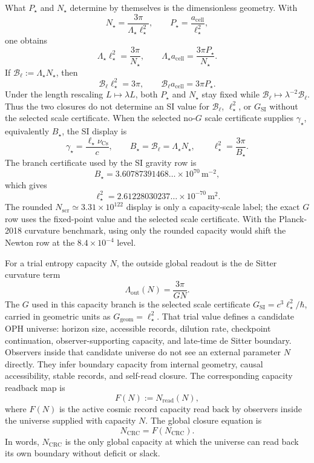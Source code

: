 What \(P_\star\) and \(N_\star\) determine by themselves is the dimensionless geometry. With
\[
N_\star=\frac{3\pi}{\Lambda_\star\ell_\star^2},
\qquad
P_\star=\frac{a_{\mathrm{cell}}}{\ell_\star^2},
\]
one obtains
\[
\Lambda_\star\ell_\star^2=\frac{3\pi}{N_\star},
\qquad
\Lambda_\star a_{\mathrm{cell}}=\frac{3\pi P_\star}{N_\star}.
\]
If \(\mathcal B_\ell:=\Lambda_\star N_\star\), then
\[
\mathcal B_\ell\ell_\star^2=3\pi,
\qquad
\mathcal B_\ell a_{\mathrm{cell}}=3\pi P_\star.
\]
Under the length rescaling \(L\mapsto\lambda L\), both \(P_\star\) and \(N_\star\) stay fixed while
\(\mathcal B_\ell\mapsto\lambda^{-2}\mathcal B_\ell\). Thus the two closures do not determine an
SI value for \(\mathcal B_\ell\), \(\ell_\star^2\), or \(G_{\mathrm{SI}}\) without the selected
scale certificate.
When the selected no-\(G\) scale certificate supplies \(\gamma_\star\), equivalently
\(B_\star\), the SI display is
\[
\gamma_\star=\frac{\ell_\star\nu_{\mathrm{Cs}}}{c},
\qquad
B_\star=\mathcal B_\ell=\Lambda_\star N_\star,
\qquad
\ell_\star^2=\frac{3\pi}{B_\star}.
\]
The branch certificate used by the SI gravity row is
\[
B_\star=
3.60787391468\ldots
\times10^{70}\,\mathrm{m^{-2}},
\]
which gives
\[
\ell_\star^2=
2.61228030237\ldots
\times10^{-70}\,\mathrm{m^2}.
\]
The rounded \(N_{\mathrm{scr}}\simeq3.31\times10^{122}\) display is only a capacity-scale label;
the exact \(G\) row uses the fixed-point value and the selected scale certificate. With the
Planck-2018 curvature benchmark, using only the rounded capacity would shift the Newton row at the
\(8.4\times10^{-4}\) level.

For a trial entropy capacity \(N\), the outside global readout is the de Sitter curvature term
\[
\Lambda_{\mathrm{out}}(N)=\frac{3\pi}{G N}.
\]
The \(G\) used in this capacity branch is the selected scale certificate
\(G_{\mathrm{SI}}=c^3\ell_\star^2/\hbar\), carried in geometric units as
\(G_{\mathrm{geom}}=\ell_\star^2\).
That trial value defines a candidate OPH universe: horizon size, accessible records, dilution rate,
checkpoint continuation, observer-supporting capacity, and late-time de Sitter boundary. Observers
inside that candidate universe do not see an external parameter \(N\) directly. They infer boundary
capacity from internal geometry, causal accessibility, stable records, and self-read closure. The
corresponding capacity readback map is
\[
F(N):=N_{\mathrm{read}}(N),
\]
where \(F(N)\) is the active cosmic record capacity read back by observers inside the universe
supplied with capacity \(N\). The global closure equation is
\[
\boxed{N_{\mathrm{CRC}}=F(N_{\mathrm{CRC}}).}
\]
In words, \(N_{\mathrm{CRC}}\) is the only global capacity at which the universe can read back its
own boundary without deficit or slack.


